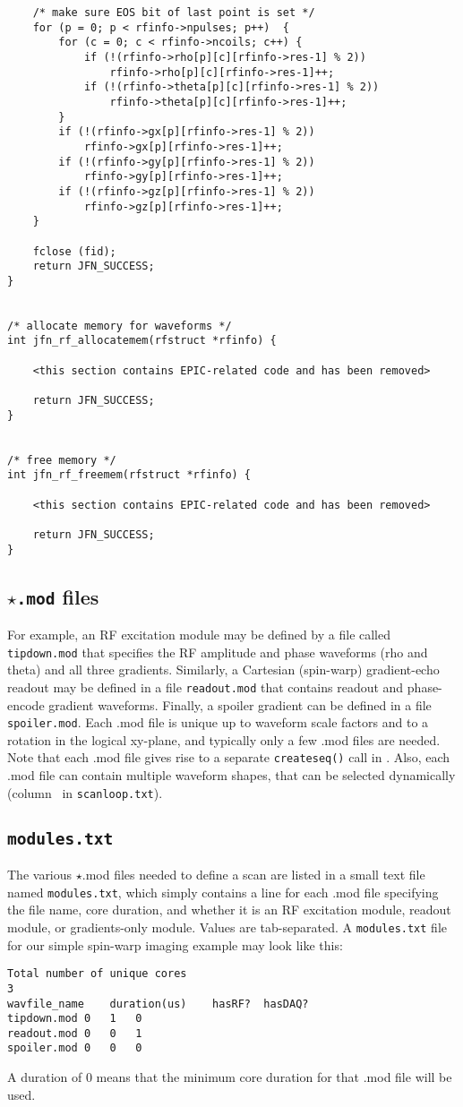 \begin{lstlisting}
	/* make sure EOS bit of last point is set */
	for (p = 0; p < rfinfo->npulses; p++)  {
		for (c = 0; c < rfinfo->ncoils; c++) {
			if (!(rfinfo->rho[p][c][rfinfo->res-1] % 2))
				rfinfo->rho[p][c][rfinfo->res-1]++;
			if (!(rfinfo->theta[p][c][rfinfo->res-1] % 2))
				rfinfo->theta[p][c][rfinfo->res-1]++;
		}
		if (!(rfinfo->gx[p][rfinfo->res-1] % 2))
			rfinfo->gx[p][rfinfo->res-1]++;
		if (!(rfinfo->gy[p][rfinfo->res-1] % 2))
			rfinfo->gy[p][rfinfo->res-1]++;
		if (!(rfinfo->gz[p][rfinfo->res-1] % 2))
			rfinfo->gz[p][rfinfo->res-1]++;
	}

	fclose (fid);
	return JFN_SUCCESS;
}


/* allocate memory for waveforms */
int jfn_rf_allocatemem(rfstruct *rfinfo) {

	<this section contains EPIC-related code and has been removed>

	return JFN_SUCCESS;
}


/* free memory */
int jfn_rf_freemem(rfstruct *rfinfo) {

	<this section contains EPIC-related code and has been removed>

	return JFN_SUCCESS;
}

\end{lstlisting}

\subsection{ {\tt $\star$.mod} files}
For example, an RF excitation module may be defined by a file called {\tt tipdown.mod} that specifies the RF amplitude and phase waveforms (rho and theta) and all three gradients.
Similarly, a Cartesian (spin-warp) gradient-echo readout may be defined in a file {\tt readout.mod} that contains readout and phase-encode gradient waveforms.
Finally, a spoiler gradient can be defined in a file {\tt spoiler.mod}.
Each .mod file is unique up to waveform scale factors and to a rotation in the logical xy-plane, and typically only a few .mod files are needed.
Note that each .mod file gives rise to a separate {\tt createseq()} call in \toppe.
Also, each .mod file can contain multiple waveform shapes, that can be selected dynamically (column \waveformnum~in {\tt scanloop.txt}).

\subsection{\tt modules.txt}
The various $\star$.mod files needed to define a scan are listed in a small text file named {\tt modules.txt}, which simply contains a line for each .mod file specifying the file name, core duration, and whether it is an RF excitation module, readout module, or gradients-only module.
Values are tab-separated.
A {\tt modules.txt} file for our simple spin-warp imaging example may look like this:
\begin{lstlisting}
Total number of unique cores
3
wavfile_name	duration(us)	hasRF?	hasDAQ?
tipdown.mod	0	1	0
readout.mod	0	0	1
spoiler.mod	0	0	0
\end{lstlisting}
A duration of 0 means that the minimum core duration for that .mod file will be used.

